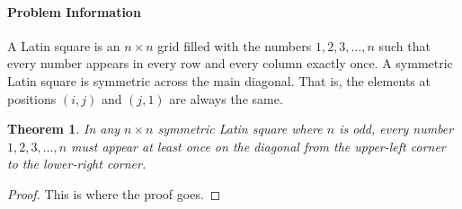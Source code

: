 \documentclass[10pt,letter]{article}
\newtheorem*{thm}{Theorem}
\begin{document}
\paragraph{Problem Information}
A Latin square is an $n \times n$ grid filled with the numbers $1, 2, 3, \ldots, n$ such that every number appears in every row and every column exactly once. A symmetric Latin square is symmetric across the main diagonal. That is, the elements at positions $(i, j)$ and $(j, 1)$ are always the same.

\begin{thm}In any $n \times n$ symmetric Latin square where $n$ is odd, every number $1, 2, 3, \ldots, n$ must appear at least once on the diagonal from the upper-left corner to the lower-right corner.\end{thm}

\begin{proof}
  This is where the proof goes.
\end{proof}


\end{document}
